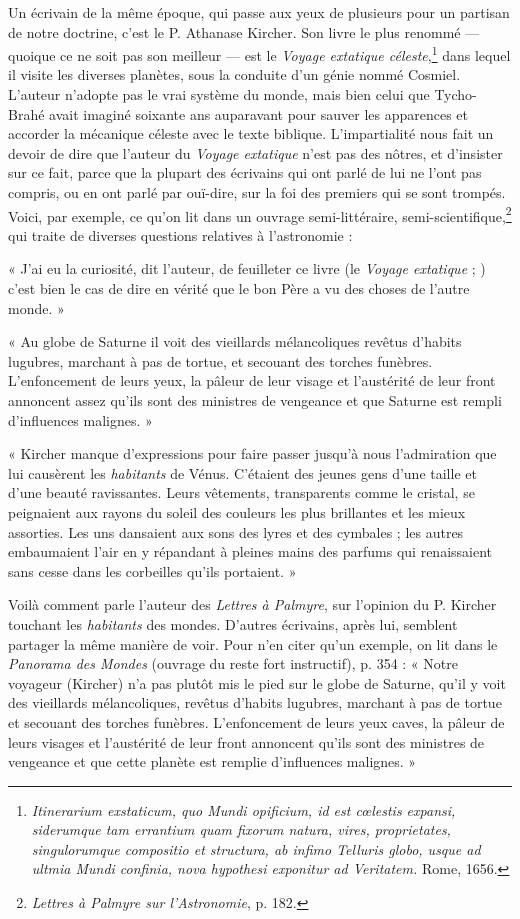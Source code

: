 \documentclass[a4paper, 11pt, oneside]{article}
\begin{document}
Un écrivain de la même époque, qui passe aux yeux de plusieurs pour un partisan de notre doctrine, c'est le P. Athanase Kircher. Son livre le plus renommé --- quoique ce ne soit pas son meilleur --- est le \emph{Voyage extatique céleste},\footnote{\emph{Itinerarium exstaticum, quo Mundi opificium, id est cœlestis expansi, siderumque tam errantium quam fixorum natura, vires, proprietates, singulorumque compositio et structura, ab infimo Telluris globo, usque ad ultmia Mundi confinia, nova hypothesi exponitur ad Veritatem.} Rome, 1656.} dans lequel il visite les diverses planètes, sous la conduite d'un génie nommé Cosmiel. L'auteur n'adopte pas le vrai système du monde, mais bien celui que Tycho-Brahé avait imaginé soixante ans auparavant pour sauver les apparences et accorder la mécanique céleste avec le texte biblique. L'impartialité nous fait un devoir de dire que l'auteur du \emph{Voyage extatique} n'est pas des nôtres, et d'insister sur ce fait, parce que la plupart des écrivains qui ont parlé de lui ne l'ont pas compris, ou en ont parlé par ouï-dire, sur la foi des premiers qui se sont trompés. Voici, par exemple, ce qu'on lit dans un ouvrage semi-littéraire, semi-scientifique,\footnote{\emph{Lettres à Palmyre sur l'Astronomie}, p. 182.} qui traite de diverses questions relatives à l'astronomie :

« J'ai eu la curiosité, dit l'auteur, de feuilleter ce livre (le \emph{Voyage extatique} ; ) c'est bien le cas de dire en vérité que le bon Père a vu des choses de l'autre monde. »

« Au globe de Saturne il voit des vieillards mélancoliques revêtus d'habits lugubres, marchant à pas de tortue, et secouant des torches funèbres. L'enfoncement de leurs yeux, la pâleur de leur visage et l'austérité de leur front annoncent assez qu'ils sont des ministres de vengeance et que Saturne est rempli d'influences malignes. »

« Kircher manque d'expressions pour faire passer jusqu'à nous l'admiration que lui causèrent les \emph{habitants} de Vénus. C'étaient des jeunes gens d'une taille et d'une beauté ravissantes. Leurs vêtements, transparents comme le cristal, se peignaient aux rayons du soleil des couleurs les plus brillantes et les mieux assorties. Les uns dansaient aux sons des lyres et des cymbales ; les autres embaumaient l'air en y répandant à pleines mains des parfums qui renaissaient sans cesse dans les corbeilles qu'ils portaient. »

Voilà comment parle l'auteur des \emph{Lettres à Palmyre}, sur l'opinion du P. Kircher touchant les \emph{habitants} des mondes. D'autres écrivains, après lui, semblent partager la même manière de voir. Pour n'en citer qu'un exemple, on lit dans le \emph{Panorama des Mondes} (ouvrage du reste fort instructif), p. 354 : « Notre voyageur (Kircher) n'a pas plutôt mis le pied sur le globe de Saturne, qu'il y voit des vieillards mélancoliques, revêtus d'habits lugubres, marchant à pas de tortue et secouant des torches funèbres. L'enfoncement de leurs yeux caves, la pâleur de leurs visages et l'austérité de leur front annoncent qu'ils sont des ministres de vengeance et que cette planète est remplie d'influences malignes. »
\end{document}

